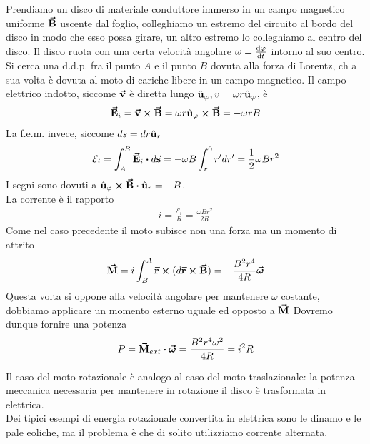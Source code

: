 \begin{examplewt}
Prendiamo un disco di materiale conduttore immerso in un campo magnetico uniforme $\vb*{\va{B}}$ uscente dal foglio, colleghiamo un estremo del circuito al bordo del disco in modo che esso possa girare, un altro estremo lo colleghiamo al centro del disco. Il disco ruota con una certa velocità angolare $\omega=\dv{\varphi}{t}$ intorno al suo centro.
Si cerca una d.d.p. fra il punto $A$ e il punto $B$ dovuta alla forza di Lorentz, ch a sua volta è dovuta al moto di cariche libere in un campo magnetico.
Il campo elettrico indotto, siccome $\vb*{\va{v}}$ è diretta lungo $\hat{\mathbf{u}}_\varphi, v=\omega r\hat{\mathbf{u}}_\varphi$, è
\begin{gather*}
	\vb*{\va{E}}_i=\vb*{\va{v}}\cross\vb*{\va{B}}=\omega r\hat{\mathbf{u}}_\varphi\cross\vb*{\va{B}}=-\omega r B
\end{gather*}
La f.e.m. invece, siccome $ds=dr\hat{\mathbf{u}}_r$
\begin{gather*}
	\mathcal{E}_i=\int^B_A \vba E_i\vdot d\vba s=-\omega B\int_r^0 r'dr'= \frac{1}{2}\omega Br^2
\end{gather*}
I segni sono dovuti a $\vbh u_\phi\cross\vba B\vdot \vbh u_r=-B$.\\
La corrente è il rapporto
\begin{gather*}
	i=\frac{\mathcal{E}_i}{R}=\frac{\omega Br^2}{2R}
\end{gather*}
Come nel caso precedente il moto subisce non una forza ma un momento di attrito
\begin{gather*}
	\vb*{\va{M}}=i\int_B^A\vb*{\va{r}}\cross(d\vb*{\va{r}}\cross\vb*{\va{B}})=-\frac{B^2r^4}{4R}\vb*{\va{\omega}}
\end{gather*}
Questa volta si oppone alla velocità angolare
per mantenere $\omega$ costante, dobbiamo applicare un momento esterno uguale ed opposto a $\vb*{\va{M}}$
Dovremo dunque fornire una potenza
\begin{gather*}
	P=\vba M_{ext}\vdot\vba\omega=\frac{B^2r^4\omega^2}{4R}=i^2R
\end{gather*}

Il caso del moto rotazionale è analogo al caso del moto traslazionale: la potenza meccanica necessaria per mantenere in rotazione il disco è trasformata in elettrica.\\
Dei tipici esempi di energia rotazionale convertita in elettrica sono le dinamo e le pale eoliche, ma il problema è che di solito utilizziamo corrente alternata.

\end{examplewt}


